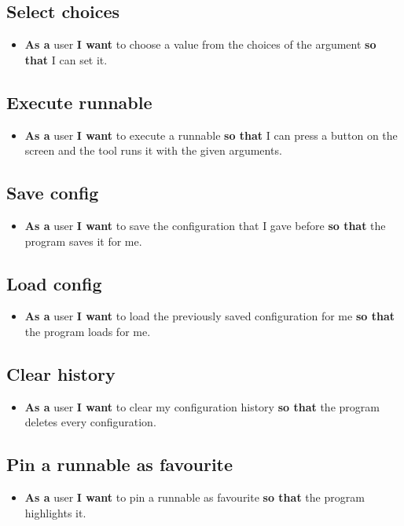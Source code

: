\documentclass{article}
\begin{document}
\subsection{Select choices}
\begin{itemize}
    \item \textbf{As a} user \textbf{I want} to choose a value from the choices of the argument \textbf{so that} I can set it.
\end{itemize}

\subsection{Execute runnable}
\begin{itemize}
    \item \textbf{As a} user \textbf{I want} to execute a runnable \textbf{so that} I can press a button on the screen and the tool runs it with the given arguments.
\end{itemize}

\subsection{Save config}
\begin{itemize}
    \item \textbf{As a} user \textbf{I want} to save the configuration that I gave before \textbf{so that} the program saves it for me.
\end{itemize}

\subsection{Load config}
\begin{itemize}
    \item \textbf{As a} user \textbf{I want} to load the previously saved configuration for me \textbf{so that} the program loads for me.
\end{itemize}

\subsection{Clear history}
\begin{itemize}
    \item \textbf{As a} user \textbf{I want} to clear my configuration history \textbf{so that} the program deletes every configuration.
\end{itemize}

\subsection{Pin a runnable as favourite}
\begin{itemize}
    \item \textbf{As a} user \textbf{I want} to pin a runnable as favourite  \textbf{so that} the program highlights it.
\end{itemize}
\end{document}
